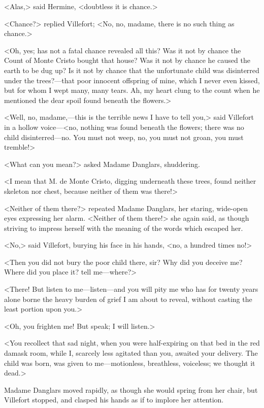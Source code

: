  <Alas,> said Hermine, <doubtless it is chance.> 

 <Chance?> replied Villefort; <No, no, madame, there is no such thing as chance.> 

 <Oh, yes; has not a fatal chance revealed all this? Was it not by chance the Count of Monte Cristo bought that house? Was it not by chance he caused the earth to be dug up? Is it not by chance that the unfortunate child was disinterred under the trees?—that poor innocent offspring of mine, which I never even kissed, but for whom I wept many, many tears. Ah, my heart clung to the count when he mentioned the dear spoil found beneath the flowers.> 

 <Well, no, madame,—this is the terrible news I have to tell you,> said Villefort in a hollow voice—<no, nothing was found beneath the flowers; there was no child disinterred—no. You must not weep, no, you must not groan, you must tremble!> 

 <What can you mean?> asked Madame Danglars, shuddering. 

 <I mean that M. de Monte Cristo, digging underneath these trees, found neither skeleton nor chest, because neither of them was there!> 

 <Neither of them there?> repeated Madame Danglars, her staring, wide-open eyes expressing her alarm. <Neither of them there!> she again said, as though striving to impress herself with the meaning of the words which escaped her. 

 <No,> said Villefort, burying his face in his hands, <no, a hundred times no!> 

 <Then you did not bury the poor child there, sir? Why did you deceive me? Where did you place it? tell me—where?> 

 <There! But listen to me—listen—and you will pity me who has for twenty years alone borne the heavy burden of grief I am about to reveal, without casting the least portion upon you.> 

 <Oh, you frighten me! But speak; I will listen.> 

 <You recollect that sad night, when you were half-expiring on that bed in the red damask room, while I, scarcely less agitated than you, awaited your delivery. The child was born, was given to me—motionless, breathless, voiceless; we thought it dead.> 

 Madame Danglars moved rapidly, as though she would spring from her chair, but Villefort stopped, and clasped his hands as if to implore her attention. 

